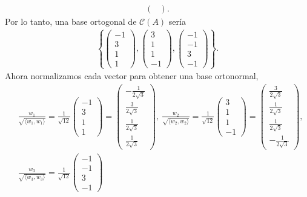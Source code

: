 \documentclass[11pt,letterpaper]{article}
\newcommand{\mcC}{\mathcal{C}}
\begin{document}
\begin{itemize}
\begin{align*}
\begin{pmatrix}
\end{pmatrix}.
\end{align*}
Por lo tanto, una base ortogonal de $\mcC(A)$ sería
\begin{align*}
\left\{\begin{pmatrix}
-1\\3\\1\\1
\end{pmatrix} ,\begin{pmatrix}
3\\1\\1\\-1
\end{pmatrix},\begin{pmatrix}
-1\\-1\\3\\-1
\end{pmatrix}\right\}.
\end{align*}
Ahora normalizamos cada vector para obtener una base ortonormal,
\begin{align*}
&\frac{w_1}{\sqrt{\langle w_1, w_1 \rangle}} = \frac{1}{\sqrt{12}}\begin{pmatrix}
-1\\3\\1\\1
\end{pmatrix} = \begin{pmatrix}
-\frac{1}{2\sqrt{3}}\\\frac{3}{2\sqrt{3}}\\\frac{1}{2\sqrt{3}}\\\frac{1}{2\sqrt{3}}
\end{pmatrix}, \ \frac{w_2}{\sqrt{\langle w_2, w_2 \rangle}} = \frac{1}{\sqrt{12}}\begin{pmatrix}
3\\1\\1\\-1
\end{pmatrix} = \begin{pmatrix}
\frac{3}{2\sqrt{3}}\\\frac{1}{2\sqrt{3}}\\ \frac{1}{2\sqrt{3}}\\ -\frac{1}{2\sqrt{3}}
\end{pmatrix},\\
&\frac{w_3}{\sqrt{\langle w_3, w_3 \rangle}} = \frac{1}{\sqrt{12}}\begin{pmatrix}
-1\\-1\\3\\-1

\end{pmatrix}
\end{align*}
\end{itemize}
\end{document}
